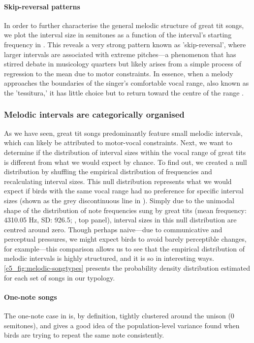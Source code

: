 \paragraph{Skip-reversal patterns}
In order to further characterise the general melodic structure of great tit songs, we plot the interval size in semitones as a function of the interval's starting frequency in . This reveals a very strong pattern known as 'skip-reversal', where larger intervals are associated with extreme pitches---a phenomenon that has stirred debate in musicology quarters \autocite{vonhippel2000} but likely arises from a simple process of regression to the mean due to motor constraints. In essence, when a melody approaches the boundaries of the singer's comfortable vocal range, also known as the 'tessitura,' it has little choice but to return toward the centre of the range \autocite{tierney2008, vonhippel2000, vonhippel2000a}. 



\subsubsection{Melodic intervals are categorically organised}
As we have seen, great tit songs predominantly feature small melodic intervals, which can likely be attributed to motor-vocal constraints. Next, we want to determine if the distribution of interval sizes within the vocal range of great tits is different from what we would expect by chance. To find out, we created a null distribution by shuffling the empirical distribution of frequencies and recalculating interval sizes. This null distribution represents what we would expect if birds with the same vocal range had no preference for specific interval sizes (shown as the grey discontinuous line in ). Simply due to the unimodal shape of the distribution of note frequencies sung by great tits (mean frequency: 4310.05 Hz, SD: 926.5; , top panel), interval sizes in this null distribution are centred around zero. Though perhaps naive---due to communicative and perceptual pressures, we might expect birds to avoid barely perceptible changes, for example---this comparison allows us to see that the empirical distribution of melodic intervals is highly structured, and it is so in interesting ways. \autoref{c5_fig:melodic-songtypes} presents the probability density distribution estimated for each set of songs in our typology.


\paragraph{One-note songs} 
The one-note case in  is, by definition, tightly clustered around the unison (0 semitones), and gives a good idea of the population-level variance found when birds are trying to repeat the same note consistently.

